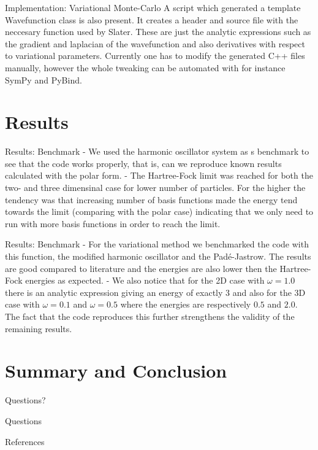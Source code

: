 \documentclass[10pt]{beamer}
\begin{document}
\begin{frame}[fragile]{Implementation: Variational Monte-Carlo}
    A script which generated a template Wavefunction class is also present. It
    creates a header and source file with the neccesary function used by
    Slater. These are just the analytic expressions such as the gradient and
    laplacian of the wavefunction and also derivatives with respect to
    variational parameters. Currently one has to modify the generated C++ files
    manually, however the whole tweaking can be automated with for instance
    SymPy and PyBind.
\end{frame}

\section{Results}

\begin{frame}[fragile]{Results: Benchmark}
    - We used the harmonic oscillator system as s benchmark to see that the
    code works properly, that is, can we reproduce known results calculated
    with the polar form.
    - The Hartree-Fock limit was reached for both the two- and three dimensinal
    case for lower number of particles. For the higher the tendency was that
    increasing number of basis functions made the energy tend towards the limit
    (comparing with the polar case) indicating that we only need to run with
    more basis functions in order to reach the limit.
\end{frame}

\begin{frame}[fragile]{Results: Benchmark}
    - For the variational method we benchmarked the code with this function,
    the modified harmonic oscillator and the Pad\'e-Jastrow. The results are
    good compared to literature and the energies are also lower then the
    Hartree-Fock energies as expected.
    - We also notice that for the 2D case with $\omega=1.0$ there is an
    analytic expression giving an energy of exactly $3$ and also for the 3D
    case with $\omega=0.1$ and $\omega=0.5$ where the energies are respectively
    $0.5$ and $2.0$. The fact that the code reproduces this further strengthens
    the validity of the remaining results.
\end{frame}

\section{Summary and Conclusion}

{
\begin{frame}[standout]
  Questions?
\end{frame}
}

\appendix

\begin{frame}[fragile]{Questions}
\end{frame}

\begin{frame}[allowframebreaks]{References}

  
  

\end{frame}
\end{document}
